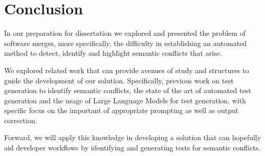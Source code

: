 \chapter{Conclusion}\label{chap:chap4}

In our preparation for dissertation we explored and presented the problem of software merges, more specifically, the difficulty in establishing an automated method to detect, identify and highlight semantic conflicts that arise.

We explored related work that can provide avenues of study and structures to guide the development of our solution. Specifically, previous work on test generation to identify semantic conflicts, the state of the art of automated test generation and the usage of Large Language Models for test generation, with specific focus on the important of appropriate prompting as well as output correction.

Forward, we will apply this knowledge in developing a solution that can hopefully aid developer workflows by identifying and generating tests for semantic conflicts.